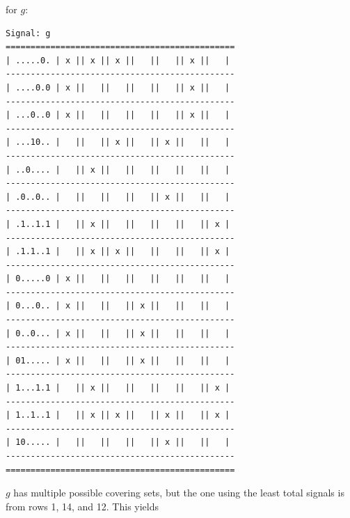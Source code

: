 \documentclass{article}
\begin{document}
\begin{enumerate}
            for $g$:
            \begin{scriptsize}
            \begin{verbatim}
Signal: g
==============================================
| .....0. | x || x || x ||   ||   || x ||   |
----------------------------------------------
| ....0.0 | x ||   ||   ||   ||   || x ||   |
----------------------------------------------
| ...0..0 | x ||   ||   ||   ||   || x ||   |
----------------------------------------------
| ...10.. |   ||   || x ||   || x ||   ||   |
----------------------------------------------
| ..0.... |   || x ||   ||   ||   ||   ||   |
----------------------------------------------
| .0..0.. |   ||   ||   ||   || x ||   ||   |
----------------------------------------------
| .1..1.1 |   || x ||   ||   ||   ||   || x |
----------------------------------------------
| .1.1..1 |   || x || x ||   ||   ||   || x |
----------------------------------------------
| 0.....0 | x ||   ||   ||   ||   ||   ||   |
----------------------------------------------
| 0...0.. | x ||   ||   || x ||   ||   ||   |
----------------------------------------------
| 0..0... | x ||   ||   || x ||   ||   ||   |
----------------------------------------------
| 01..... | x ||   ||   || x ||   ||   ||   |
----------------------------------------------
| 1...1.1 |   || x ||   ||   ||   ||   || x |
----------------------------------------------
| 1..1..1 |   || x || x ||   || x ||   || x |
----------------------------------------------
| 10..... |   ||   ||   ||   || x ||   ||   |
----------------------------------------------
==============================================
            \end{verbatim}
            \end{scriptsize}
            $g$ has multiple possible covering sets, but the one using the least
            total signals is from rows 1, 14, and 12. This yields


\end{enumerate}
\end{document}

